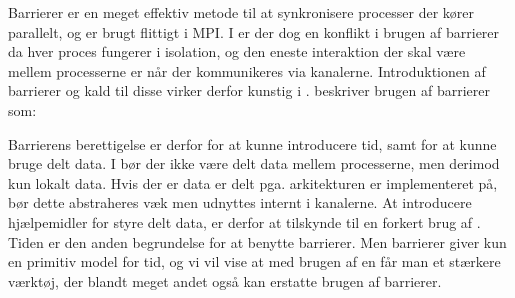 Barrierer er en meget effektiv metode til at synkronisere processer der kører 
parallelt, og er brugt flittigt i MPI. I \csp er der dog en konflikt i brugen 
af barrierer da hver proces fungerer i isolation, og den eneste interaktion der 
skal være mellem processerne er når der kommunikeres via kanalerne. 
Introduktionen af barrierer og kald til disse virker derfor kunstig i \csp. 
\citeauthor{crew} beskriver brugen af barrierer som:


Barrierens berettigelse er derfor for at kunne introducere tid, samt for at kunne bruge delt data. I \csp bør der ikke være delt data mellem processerne, men derimod kun  lokalt data. Hvis der er data er delt pga. arkitekturen \csp er implementeret på, bør dette abstraheres væk men udnyttes internt i kanalerne. At introducere hjælpemidler for styre delt data, er derfor at tilskynde til en forkert brug af \csp. Tiden er den anden begrundelse for at benytte barrierer.
Men barrierer giver kun en  primitiv model for tid, og vi vil vise at med brugen af en \des får man et stærkere værktøj, der blandt meget andet også kan erstatte brugen af barrierer.


